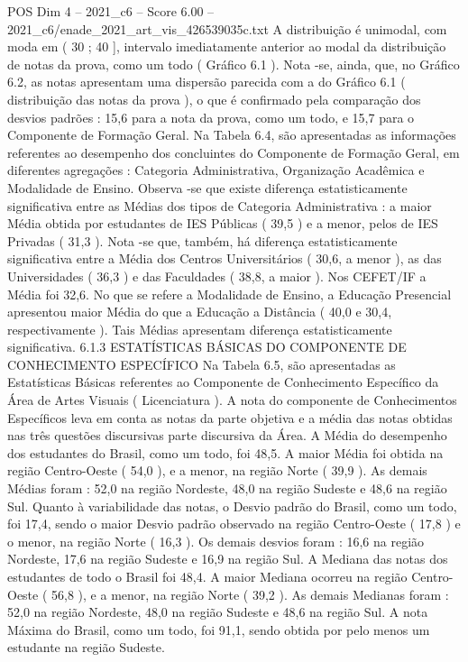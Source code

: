 \begin{textsample}{POS Dim 4 – 2021\_c6 – Score 6.00 – 2021\_c6/enade\_2021\_art\_vis\_426539035c.txt}
A distribuição é unimodal, com moda em ( 30 ; 40 ], intervalo imediatamente anterior ao modal da distribuição de notas da prova, como um todo ( Gráfico 6.1 ).
Nota -se, ainda, que, no Gráfico 6.2, as notas apresentam uma dispersão parecida com a do Gráfico 6.1 ( distribuição das notas da prova ), o que é confirmado pela comparação dos desvios padrões : 15,6 para a nota da prova, como um todo, e 15,7 para o Componente de Formação Geral.
Na Tabela 6.4, são apresentadas as informações referentes ao desempenho dos concluintes do Componente de Formação Geral, em diferentes agregações : Categoria Administrativa, Organização Acadêmica e Modalidade de Ensino.
Observa -se que existe diferença estatisticamente significativa entre as Médias dos tipos de Categoria Administrativa : a maior Média obtida por estudantes de IES Públicas ( 39,5 ) e a menor, pelos de IES Privadas ( 31,3 ).
Nota -se que, também, há diferença estatisticamente significativa entre a Média dos Centros Universitários ( 30,6, a menor ), as das Universidades ( 36,3 ) e das Faculdades ( 38,8, a maior ).
Nos CEFET/IF a Média foi 32,6.
No que se refere a Modalidade de Ensino, a Educação Presencial apresentou maior Média do que a Educação a Distância ( 40,0 e 30,4, respectivamente ).
Tais Médias apresentam diferença estatisticamente significativa. 6.1.3 ESTATÍSTICAS BÁSICAS DO COMPONENTE DE CONHECIMENTO ESPECÍFICO Na Tabela 6.5, são apresentadas as Estatísticas Básicas referentes ao Componente de Conhecimento Específico da Área de Artes Visuais ( Licenciatura ).
A nota do componente de Conhecimentos Específicos leva em conta as notas da parte objetiva e a média das notas obtidas nas três questões discursivas parte discursiva da Área.
A Média do desempenho dos estudantes do Brasil, como um todo, foi 48,5.
A maior Média foi obtida na região Centro-Oeste ( 54,0 ), e a menor, na região Norte ( 39,9 ).
As demais Médias foram : 52,0 na região Nordeste, 48,0 na região Sudeste e 48,6 na região Sul.
Quanto à variabilidade das notas, o Desvio padrão do Brasil, como um todo, foi 17,4, sendo o maior Desvio padrão observado na região Centro-Oeste ( 17,8 ) e o menor, na região Norte ( 16,3 ).
Os demais desvios foram : 16,6 na região Nordeste, 17,6 na região Sudeste e 16,9 na região Sul.
A Mediana das notas dos estudantes de todo o Brasil foi 48,4.
A maior Mediana ocorreu na região Centro-Oeste ( 56,8 ), e a menor, na região Norte ( 39,2 ).
As demais Medianas foram : 52,0 na região Nordeste, 48,0 na região Sudeste e 48,6 na região Sul.
A nota Máxima do Brasil, como um todo, foi 91,1, sendo obtida por pelo menos um estudante na região Sudeste.

\end{textsample}
